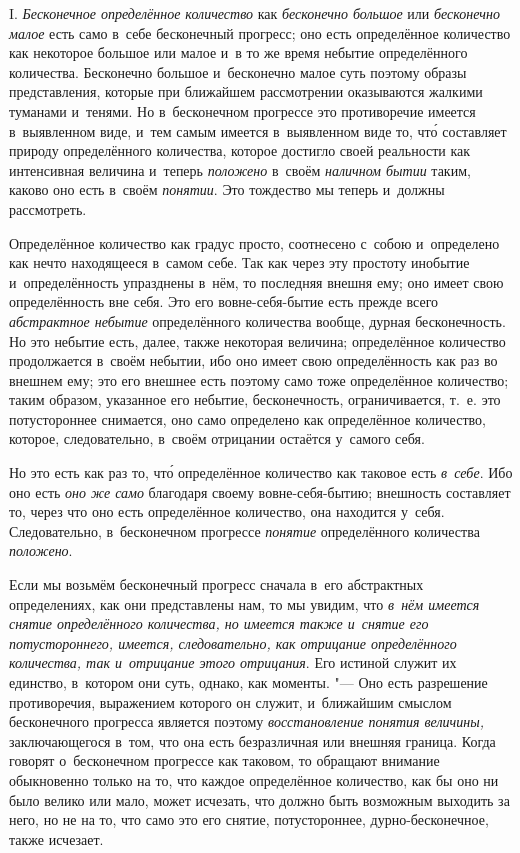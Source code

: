 
I. {\em Бесконечное определённое количество} как {\em бесконечно большое} или
{\em бесконечно малое} есть само в~себе бесконечный прогресс; оно есть
определённое количество как некоторое большое или малое и~в то же время
небытие определённого количества. Бесконечно большое и~бесконечно малое суть
поэтому образы представления, которые при ближайшем рассмотрении оказываются
жалкими туманами и~тенями. Но в~бесконечном прогрессе это противоречие имеется
в~выявленном виде, и~тем самым имеется в~выявленном виде то, чт\'{о} составляет
природу определённого количества, которое достигло своей реальности как
интенсивная величина и~теперь {\em положено} в~своём {\em наличном бытии}
таким, каково оно есть в~своём {\em понятии}. Это тождество мы теперь и~должны
рассмотреть.

Определённое количество как градус просто, соотнесено с~собою и~определено как
нечто находящееся в~самом себе. Так как через эту простоту инобытие
и~определённость упразднены в~нём, то последняя внешня ему; оно имеет свою
определённость вне себя. Это его вовне-себя-бытие есть прежде всего
{\em абстрактное небытие} определённого количества вообще, дурная
бесконечность. Но это небытие есть, далее, также некоторая величина;
определённое количество продолжается в~своём небытии, ибо оно имеет свою
определённость как раз во внешнем ему; это его внешнее есть поэтому само тоже
определённое количество; таким образом, указанное его небытие, бесконечность,
ограничивается, т.~е. это потустороннее снимается, оно само определено как
определённое количество, которое, следовательно, в~своём отрицании остаётся
у~самого себя.

Но это есть как раз то, чт\'{о} определённое количество как таковое есть
{\em в~себе}. Ибо оно есть {\em оно же само} благодаря своему вовне-себя-бытию;
внешность составляет то, через что оно есть определённое количество, она находится
у~себя. Следовательно, в~бесконечном прогрессе {\em понятие} определённого
количества {\em положено}.

Если мы возьмём бесконечный прогресс сначала в~его абстрактных определениях,
как они представлены нам, то мы увидим, что {\em в~нём имеется снятие
определённого количества, но имеется также и~снятие его потустороннего,
имеется, следовательно, как отрицание определённого количества, так и~отрицание
этого отрицания}. Его истиной служит их единство, в~котором они суть, однако,
как моменты. "--- Оно есть разрешение противоречия, выражением которого он
служит, и~ближайшим смыслом бесконечного прогресса является поэтому
{\em восстановление понятия величины,} заключающегося в~том, что она есть
безразличная или внешняя граница. Когда говорят о~бесконечном прогрессе как
таковом, то обращают внимание обыкновенно только на то, что каждое определённое
количество, как бы оно ни было велико или мало, может исчезать, что должно быть
возможным выходить за него, но не на то, что само это его снятие,
потустороннее, дурно-бесконечное, также исчезает.

